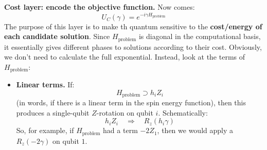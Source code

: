 \begin{deepeningbox}
    \highspace
     \textbf{Cost layer: encode the objective function.} Now comes:
    \begin{equation*}
        U_C(\gamma) = e^{-i \gamma H_{\text{problem}}}
    \end{equation*}
    The purpose of this layer is to make th quantum sensitive to the \textbf{cost/energy of each candidate solution}. Since $H_{\text{problem}}$ is diagonal in the computational basis, it essentially gives different phases to solutions according to their cost. Obviously, we don't need to calculate the full exponential. Instead, look at the terms of $H_{\text{problem}}$:
    \begin{itemize}
        \item \textbf{Linear terms.} If:
            \begin{equation*}
                H_{\text{problem}} \supset h_i Z_i
            \end{equation*}
            (in words, if there is a linear term in the spin energy function), then this produces a single-qubit $Z$-rotation on qubit $i$. Schematically:
            \begin{equation*}
                h_i Z_i \quad \Rightarrow \quad R_z \left(h_i \gamma\right)
            \end{equation*}
            So, for example, if $H_{\text{problem}}$ had a term $-2 Z_1$, then we would apply a $R_z(-2\gamma)$ on qubit $1$.


\end{itemize}
\end{deepeningbox}
